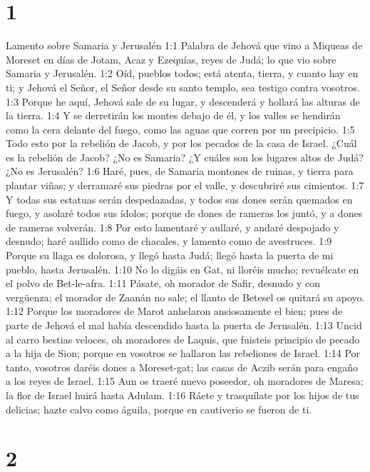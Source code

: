 
\chapter{1}

Lamento sobre Samaria y Jerusalén  
1:1 Palabra de Jehová que vino a Miqueas de Moreset en días de Jotam, Acaz y Ezequías, reyes de Judá; lo que vio sobre Samaria y Jerusalén.  
1:2 Oíd, pueblos todos; está atenta, tierra, y cuanto hay en ti; y Jehová el Señor, el Señor desde su santo templo, sea testigo contra vosotros.  
1:3 Porque he aquí, Jehová sale de su lugar, y descenderá y hollará las alturas de la tierra.  
1:4 Y se derretirán los montes debajo de él, y los valles se hendirán como la cera delante del fuego, como las aguas que corren por un precipicio.  
1:5 Todo esto por la rebelión de Jacob, y por los pecados de la casa de Israel. ¿Cuál es la rebelión de Jacob? ¿No es Samaria? ¿Y cuáles son los lugares altos de Judá? ¿No es Jerusalén?  
1:6 Haré, pues, de Samaria montones de ruinas, y tierra para plantar viñas; y derramaré sus piedras por el valle, y descubriré sus cimientos.  
1:7 Y todas sus estatuas serán despedazadas, y todos sus dones serán quemados en fuego, y asolaré todos sus ídolos; porque de dones de rameras los juntó, y a dones de rameras volverán.  
1:8 Por esto lamentaré y aullaré, y andaré despojado y desnudo; haré aullido como de chacales, y lamento como de avestruces.  
1:9 Porque su llaga es dolorosa, y llegó hasta Judá; llegó hasta la puerta de mi pueblo, hasta Jerusalén.  
1:10 No lo digáis en Gat, ni lloréis mucho; revuélcate en el polvo de Bet-le-afra.  
1:11 Pásate, oh morador de Safir, desnudo y con vergüenza; el morador de Zaanán no sale; el llanto de Betesel os quitará su apoyo.  
1:12 Porque los moradores de Marot anhelaron ansiosamente el bien; pues de parte de Jehová el mal había descendido hasta la puerta de Jerusalén.  
1:13 Uncid al carro bestias veloces, oh moradores de Laquis, que fuisteis principio de pecado a la hija de Sion; porque en vosotros se hallaron las rebeliones de Israel.  
1:14 Por tanto, vosotros daréis dones a Moreset-gat; las casas de Aczib serán para engaño a los reyes de Israel.  
1:15 Aun os traeré nuevo poseedor, oh moradores de Maresa; la flor de Israel huirá hasta Adulam.  
1:16 Ráete y trasquílate por los hijos de tus delicias; hazte calvo como águila, porque en cautiverio se fueron de ti.  

\chapter{2}

